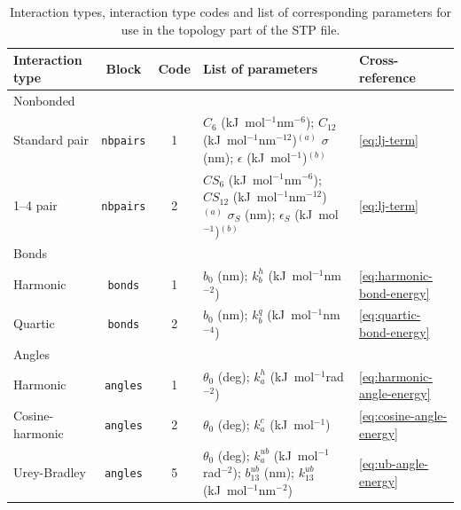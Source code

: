 \documentclass[10pt,a4paper,openany]{memoir}
\numberwithin{equation}{section}
\begin{document}
\begin{table}[tb]
  \centering
  \caption{Interaction types, interaction type codes and list of corresponding parameters for use in the topology part of the STP file.}
  \label{table:stp-types}
  \vspace{2ex}\par
  \begin{tabular}{lccp{49ex}l}
    \toprule
Interaction type & Block & Code & List of parameters & Cross-reference\\
\midrule
Nonbonded & &  &  & \\
\hspace{1ex} Standard pair & \texttt{nbpairs} &  1 & $C_6$ (kJ~mol$^{-1}$nm$^{-6}$); $C_{12}$ (kJ~mol$^{-1}$nm$^{-12}$)$^{(a)}$ \newline $\sigma$ (nm); $\epsilon$ (kJ~mol$^{-1}$)$^{(b)}$& \autoref{eq:lj-term}\\
\hspace{1ex} 1--4 pair & \texttt{nbpairs} &  2 & $CS_6$ (kJ~mol$^{-1}$nm$^{-6}$); $CS_{12}$ (kJ~mol$^{-1}$nm$^{-12}$)$^{(a)}$ \newline $\sigma_S$ (nm); $\epsilon_S$ (kJ~mol$^{-1}$)$^{(b)}$ & \autoref{eq:lj-term}\\
\hline
Bonds &  &  & \\
\hspace{1ex} Harmonic & \texttt{bonds} &  1 & \(b_0\) (nm); \(k_b^h\) (kJ~mol$^{-1}$nm$^{-2}$) & \autoref{eq:harmonic-bond-energy}\\
\hspace{1ex} Quartic & \texttt{bonds} &  2 & \(b_0\) (nm); \(k_b^q\) (kJ~mol$^{-1}$nm$^{-4}$) & \autoref{eq:quartic-bond-energy}\\
\hline
Angles & &  &  & \\
\hspace{1ex} Harmonic & \texttt{angles} &  1 & \(\theta_0\) (deg); \(k_a^h\) (kJ~mol$^{-1}$rad$^{-2}$) & \autoref{eq:harmonic-angle-energy}\\
\hspace{1ex} Cosine-harmonic & \texttt{angles} &  2 & \(\theta_0\) (deg); \(k_a^c\) (kJ~mol$^{-1}$) &\autoref{eq:cosine-angle-energy}\\
\hspace{1ex} Urey-Bradley & \texttt{angles} &  5 & \(\theta_0\) (deg); \(k_a^{ub}\) (kJ~mol$^{-1}$rad$^{-2}$); \newline \(b_{13}^{ub}\) (nm); \(k_{13}^{ub}\) (kJ~mol$^{-1}$nm$^{-2}$) & \autoref{eq:ub-angle-energy}\\
\hline

\end{tabular}
\end{table}
\end{document}
